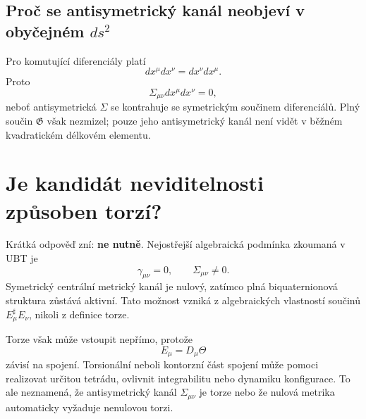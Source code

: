 \begin{center}
\end{center}

\subsection{Proč se antisymetrický kanál neobjeví v obyčejném \texorpdfstring{$ds^2$}{ds2}}
Pro komutující diferenciály platí
\[
  dx^\mu dx^\nu=dx^\nu dx^\mu.
\]
Proto
\[
  \Sigma_{\mu\nu}dx^\mu dx^\nu=0,
\]
neboť antisymetrická $\Sigma$ se kontrahuje se symetrickým součinem
diferenciálů. Plný součin $\mathfrak G$ však nezmizel; pouze jeho antisymetrický
kanál není vidět v běžném kvadratickém délkovém elementu.

\section{Je kandidát neviditelnosti způsoben torzí?}

Krátká odpověď zní: \textbf{ne nutně}. Nejostřejší algebraická podmínka
zkoumaná v UBT je
\[
  \boxed{\gamma_{\mu\nu}=0,
  \qquad \Sigma_{\mu\nu}\neq0.}
\]
Symetrický centrální metrický kanál je nulový, zatímco plná biquaternionová
struktura zůstává aktivní. Tato možnost vzniká z algebraických vlastností
součinů $E_\mu^\sharp E_\nu$, nikoli z definice torze.

Torze však může vstoupit nepřímo, protože
\[
  E_\mu=D_\mu\Theta
\]
závisí na spojení. Torsionální neboli kontorzní část spojení může pomoci
realizovat určitou tetrádu, ovlivnit integrabilitu nebo dynamiku konfigurace.
To ale neznamená, že antisymetrický kanál $\Sigma_{\mu\nu}$ je torze nebo že
nulová metrika automaticky vyžaduje nenulovou torzi.

